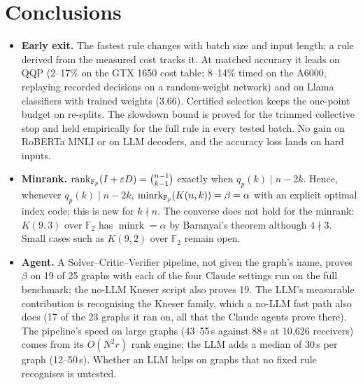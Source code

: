 \section{Conclusions}\label{sec:conclusions}
\begin{itemize}
  \item \textbf{Early exit.} The fastest rule changes with batch size and input length; a rule derived from the
  measured cost tracks it. At matched accuracy it leads on QQP (2--17\% on the GTX 1650 cost table; 8--14\% timed on
  the A6000, replaying recorded decisions on a random-weight network) and on Llama classifiers with trained weights
  (3.66\x). Certified selection keeps the one-point budget on re-splits. The slowdown bound is proved for the trimmed
  collective stop and held empirically for the full rule in every tested batch. No gain on RoBERTa MNLI or on LLM
  decoders, and the accuracy loss lands on hard inputs.
  \item \textbf{Minrank.} $\operatorname{rank}_{\mathbb{F}_p}(I+\varepsilon D)=\binom{n-1}{k-1}$ exactly when $q_p(k)\mid n-2k$.
  Hence, whenever $q_p(k)\mid n-2k$, $\operatorname{minrk}_{\mathbb{F}_p}(K(n,k))=\beta=\alpha$ with an explicit optimal
  index code; this is new for $k\nmid n$. The converse does not hold for the minrank: $K(9,3)$ over $\mathbb{F}_2$ has
  $\operatorname{minrk}=\alpha$ by Baranyai's theorem although $4\nmid3$. Small cases such as $K(9,2)$ over
  $\mathbb{F}_2$ remain open.
  \item \textbf{Agent.} A Solver--Critic--Verifier pipeline, not given the graph's name, proves $\beta$ on 19 of 25
  graphs with each of the four Claude settings run on the full benchmark; the no-LLM Kneser script also proves 19. The
  LLM's measurable contribution is recognising the Kneser family, which a no-LLM fast path also does (17 of the 23
  graphs it ran on, all that the Claude agents prove there). The pipeline's speed on large graphs (43--55\,s against
  88\,s at 10{,}626 receivers) comes from its $O(N^2r)$ rank engine; the LLM adds a median of 30\,s per graph (12--50\,s). Whether an LLM
  helps on graphs that no fixed rule recognises is untested.
\end{itemize}

